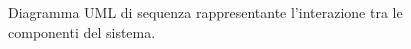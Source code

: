 \begin{figure}[h!]
    \caption{Diagramma UML di sequenza rappresentante l'interazione tra le componenti del sistema.}
    \label{img:02-sequence-diagram}
\end{figure}
